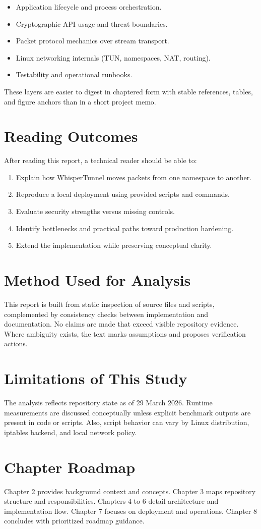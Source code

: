 \begin{itemize}[leftmargin=2em]
\item Application lifecycle and process orchestration.
\item Cryptographic API usage and threat boundaries.
\item Packet protocol mechanics over stream transport.
\item Linux networking internals (TUN, namespaces, NAT, routing).
\item Testability and operational runbooks.
\end{itemize}

These layers are easier to digest in chaptered form with stable references, tables, and figure anchors than in a short project memo.

\section{Reading Outcomes}
After reading this report, a technical reader should be able to:

\begin{enumerate}[leftmargin=2em]
\item Explain how WhisperTunnel moves packets from one namespace to another.
\item Reproduce a local deployment using provided scripts and commands.
\item Evaluate security strengths versus missing controls.
\item Identify bottlenecks and practical paths toward production hardening.
\item Extend the implementation while preserving conceptual clarity.
\end{enumerate}

\section{Method Used for Analysis}
This report is built from static inspection of source files and scripts, complemented by consistency checks between implementation and documentation. No claims are made that exceed visible repository evidence. Where ambiguity exists, the text marks assumptions and proposes verification actions.

\section{Limitations of This Study}
The analysis reflects repository state as of 29 March 2026. Runtime measurements are discussed conceptually unless explicit benchmark outputs are present in code or scripts. Also, script behavior can vary by Linux distribution, iptables backend, and local network policy.

\section{Chapter Roadmap}
Chapter 2 provides background context and concepts. Chapter 3 maps repository structure and responsibilities. Chapters 4 to 6 detail architecture and implementation flow. Chapter 7 focuses on deployment and operations. Chapter 8 concludes with prioritized roadmap guidance.
